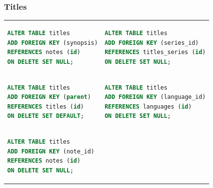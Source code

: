 \documentclass[doubleside, titlepage]{article}
\begin{document}
\subsubsection{Titles}
\begin{tabular}{ ll }
\begin{minipage}{3in}
\begin{lstlisting}[language=SQL,showspaces=false,basicstyle=\ttfamily,numberstyle=\tiny,commentstyle=\color{gray}
        ]
ALTER TABLE titles
ADD FOREIGN KEY (synopsis)
REFERENCES notes (id)
ON DELETE SET NULL;
\end{lstlisting}
\end{minipage}
&
\begin{minipage}{3in}
\begin{lstlisting}[language=SQL,showspaces=false,basicstyle=\ttfamily,numberstyle=\tiny,commentstyle=\color{gray}
        ]
ALTER TABLE titles
ADD FOREIGN KEY (series_id)
REFERENCES titles_series (id)
ON DELETE SET NULL;
\end{lstlisting}
\end{minipage}
\\
\begin{minipage}{3in}
\begin{lstlisting}[language=SQL,showspaces=false,basicstyle=\ttfamily,numberstyle=\tiny,commentstyle=\color{gray}
        ]
ALTER TABLE titles
ADD FOREIGN KEY (parent)
REFERENCES titles (id)
ON DELETE SET DEFAULT;
\end{lstlisting}
\end{minipage}
&
\begin{minipage}{3in}
\begin{lstlisting}[language=SQL,showspaces=false,basicstyle=\ttfamily,numberstyle=\tiny,commentstyle=\color{gray}
        ]
ALTER TABLE titles
ADD FOREIGN KEY (language_id)
REFERENCES languages (id)
ON DELETE SET NULL;
\end{lstlisting}
\end{minipage}
\\
\begin{minipage}{3in}
\begin{lstlisting}[language=SQL,showspaces=false,basicstyle=\ttfamily,numberstyle=\tiny,commentstyle=\color{gray}
        ]
ALTER TABLE titles
ADD FOREIGN KEY (note_id)
REFERENCES notes (id)
ON DELETE SET NULL;
\end{lstlisting}
\end{minipage}
\end{tabular}
\end{document}

